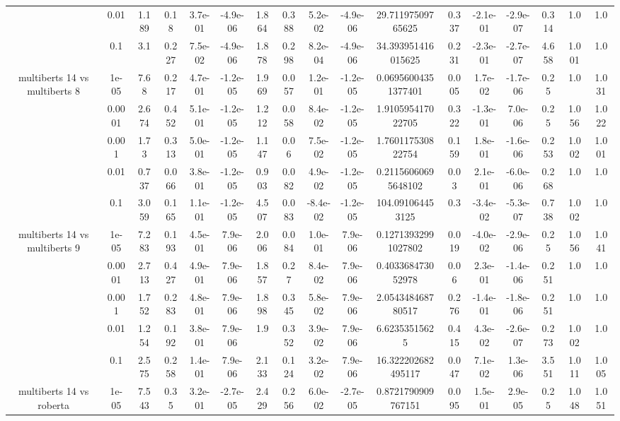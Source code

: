 \begin{tabular}{|c|c|c|c|c|c|c|c|c|c|c|c|c|c|c|c|c|}
 & 0.01 & 1.189 & 0.18 & 3.7e-01 & -4.9e-06 & 1.864 & 0.388 & 5.2e-02 & -4.9e-06 & 29.71197509765625 & 0.337 & -2.1e-01 & -2.9e-07 & 0.314 & 1.0 & 1.0 \\
 & 0.1 & 3.1 & 0.227 & 7.5e-02 & -4.9e-06 & 1.878 & 0.298 & 8.2e-04 & -4.9e-06 & 34.393951416015625 & 0.231 & -2.3e-01 & -2.7e-07 & 4.658 & 1.001 & 1.0 \\
\hline
\multirow{5}{*}{multiberts 14 vs multiberts 8} & 1e-05 & 7.68 & 0.217 & 4.7e-01 & -1.2e-05 & 1.969 & 0.057 & 1.2e-01 & -1.2e-05 & 0.06956004351377401 & 0.005 & 1.7e-02 & -1.7e-06 & 0.25 & 1.0 & 1.031 \\
 & 0.0001 & 2.674 & 0.452 & 5.1e-01 & -1.2e-05 & 1.212 & 0.058 & 8.4e-02 & -1.2e-05 & 1.910595417022705 & 0.322 & -1.3e-01 & 7.0e-06 & 0.25 & 1.056 & 1.022 \\
 & 0.001 & 1.73 & 0.313 & 5.0e-01 & -1.2e-05 & 1.147 & 0.06 & 7.5e-02 & -1.2e-05 & 1.760117530822754 & 0.159 & 1.8e-01 & -1.6e-06 & 0.253 & 1.002 & 1.001 \\
 & 0.01 & 0.737 & 0.066 & 3.8e-01 & -1.2e-05 & 0.903 & 0.082 & 4.9e-02 & -1.2e-05 & 0.21156060695648102 & 0.03 & 2.1e-01 & -6.0e-06 & 0.268 & 1.0 & 1.0 \\
 & 0.1 & 3.059 & 0.165 & 1.1e-01 & -1.2e-05 & 4.507 & 0.083 & -8.4e-02 & -1.2e-05 & 104.091064453125 & 0.3 & -3.4e-02 & -5.3e-07 & 0.738 & 1.002 & 1.0 \\
\hline
\multirow{5}{*}{multiberts 14 vs multiberts 9} & 1e-05 & 7.283 & 0.193 & 4.5e-01 & 7.9e-06 & 2.006 & 0.084 & 1.0e-01 & 7.9e-06 & 0.12713932991027802 & 0.019 & -4.0e-02 & -2.9e-06 & 0.25 & 1.056 & 1.041 \\
 & 0.0001 & 2.713 & 0.427 & 4.9e-01 & 7.9e-06 & 1.857 & 0.27 & 8.4e-02 & 7.9e-06 & 0.403368473052978 & 0.06 & 2.3e-01 & -1.4e-06 & 0.251 & 1.0 & 1.0 \\
 & 0.001 & 1.752 & 0.283 & 4.8e-01 & 7.9e-06 & 1.898 & 0.345 & 5.8e-02 & 7.9e-06 & 2.054348468780517 & 0.276 & -1.4e-01 & -1.8e-06 & 0.251 & 1.0 & 1.0 \\
 & 0.01 & 1.254 & 0.192 & 3.8e-01 & 7.9e-06 & 1.9 & 0.352 & 3.9e-02 & 7.9e-06 & 6.62353515625 & 0.415 & 4.3e-02 & -2.6e-07 & 0.273 & 1.002 & 1.0 \\
 & 0.1 & 2.575 & 0.258 & 1.4e-01 & 7.9e-06 & 2.133 & 0.124 & 3.2e-02 & 7.9e-06 & 16.322202682495117 & 0.047 & 7.1e-02 & 1.3e-06 & 3.551 & 1.011 & 1.005 \\
\hline
\multirow{5}{*}{multiberts 14 vs roberta } & 1e-05 & 7.543 & 0.35 & 3.2e-01 & -2.7e-05 & 2.429 & 0.256 & 6.0e-02 & -2.7e-05 & 0.8721790909767151 & 0.095 & 1.5e-01 & 2.9e-05 & 0.25 & 1.048 & 1.051 \\

\end{tabular}
